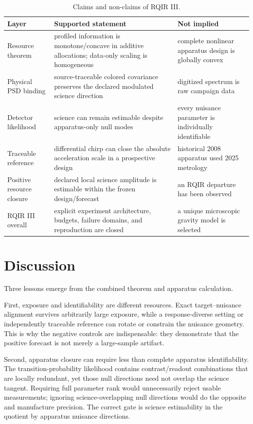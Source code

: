 \begin{table}[t]
\caption{Claims and non-claims of RQIR III.}
\label{tab:claims}
\begin{ruledtabular}
\begin{tabular}{p{}p{}p{}}
Layer & Supported statement & Not implied\\
\hline
Resource theorem & profiled information is monotone/concave in additive allocations; data-only scaling is homogeneous & complete nonlinear apparatus design is globally convex\\
Physical PSD binding & source-traceable colored covariance preserves the declared modulated science direction & digitized spectrum is raw campaign data\\
Detector likelihood & science can remain estimable despite apparatus-only null modes & every nuisance parameter is individually identifiable\\
Traceable reference & differential chirp can close the absolute acceleration scale in a prospective design & historical 2008 apparatus used 2025 metrology\\
Positive resource closure & declared local science amplitude is estimable within the frozen design/forecast & an RQIR departure has been observed\\
RQIR III overall & explicit experiment architecture, budgets, failure domains, and reproduction are closed & a unique microscopic gravity model is selected\\
\end{tabular}
\end{ruledtabular}
\end{table}

\section{Discussion}
\label{sec:discussion}

Three lessons emerge from the combined theorem and apparatus calculation.

First, exposure and identifiability are different resources. Exact target--nuisance alignment survives arbitrarily large exposure, while a response-diverse setting or independently traceable reference can rotate or constrain the nuisance geometry. This is why the negative controls are indispensable: they demonstrate that the positive forecast is not merely a large-sample artifact.

Second, apparatus closure can require less than complete apparatus identifiability. The transition-probability likelihood contains contrast/readout combinations that are locally redundant, yet those null directions need not overlap the science tangent. Requiring full parameter rank would unnecessarily reject usable measurements; ignoring science-overlapping null directions would do the opposite and manufacture precision. The correct gate is science estimability in the quotient by apparatus nuisance directions.

